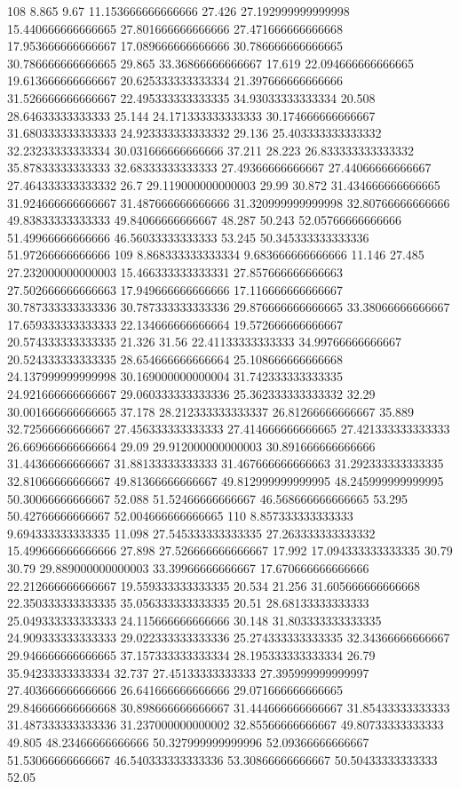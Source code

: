 108 8.865 9.67 11.153666666666666 27.426 27.192999999999998 15.440666666666665 27.801666666666666 27.471666666666668 17.953666666666667 17.089666666666666 30.786666666666665 30.786666666666665 29.865 33.36866666666667 17.619 22.094666666666665 19.613666666666667 20.625333333333334 21.397666666666666 31.526666666666667 22.495333333333335 34.93033333333334 20.508 28.64633333333333 25.144 24.171333333333333 30.174666666666667 31.680333333333333 24.923333333333332 29.136 25.403333333333332 32.23233333333334 30.031666666666666 37.211 28.223 26.833333333333332 35.87833333333333 32.68333333333333 27.49366666666667 27.44066666666667 27.464333333333332 26.7 29.119000000000003 29.99 30.872 31.434666666666665 31.924666666666667 31.487666666666666 31.320999999999998 32.80766666666666 49.83833333333333 49.84066666666667 48.287 50.243 52.05766666666666 51.49966666666666 46.56033333333333 53.245 50.345333333333336 51.97266666666666
109 8.868333333333334 9.683666666666666 11.146 27.485 27.232000000000003 15.466333333333331 27.857666666666663 27.502666666666663 17.949666666666666 17.116666666666667 30.787333333333336 30.787333333333336 29.876666666666665 33.38066666666667 17.659333333333333 22.134666666666664 19.572666666666667 20.574333333333335 21.326 31.56 22.41133333333333 34.99766666666667 20.524333333333335 28.654666666666664 25.108666666666668 24.137999999999998 30.169000000000004 31.742333333333335 24.921666666666667 29.060333333333336 25.362333333333332 32.29 30.001666666666665 37.178 28.212333333333337 26.81266666666667 35.889 32.72566666666667 27.456333333333333 27.414666666666665 27.421333333333333 26.669666666666664 29.09 29.912000000000003 30.891666666666666 31.44366666666667 31.88133333333333 31.467666666666663 31.292333333333335 32.81066666666667 49.81366666666667 49.812999999999995 48.245999999999995 50.30066666666667 52.088 51.52466666666667 46.568666666666665 53.295 50.42766666666667 52.004666666666665
110 8.857333333333333 9.694333333333335 11.098 27.545333333333335 27.263333333333332 15.499666666666666 27.898 27.526666666666667 17.992 17.094333333333335 30.79 30.79 29.889000000000003 33.39966666666667 17.670666666666666 22.212666666666667 19.559333333333335 20.534 21.256 31.605666666666668 22.350333333333335 35.056333333333335 20.51 28.68133333333333 25.049333333333333 24.115666666666666 30.148 31.803333333333335 24.909333333333333 29.022333333333336 25.274333333333335 32.34366666666667 29.946666666666665 37.157333333333334 28.195333333333334 26.79 35.94233333333334 32.737 27.45133333333333 27.395999999999997 27.403666666666666 26.641666666666666 29.071666666666665 29.846666666666668 30.898666666666667 31.444666666666667 31.85433333333333 31.487333333333336 31.237000000000002 32.85566666666667 49.80733333333333 49.805 48.23466666666666 50.327999999999996 52.09366666666667 51.53066666666667 46.540333333333336 53.30866666666667 50.50433333333333 52.05
